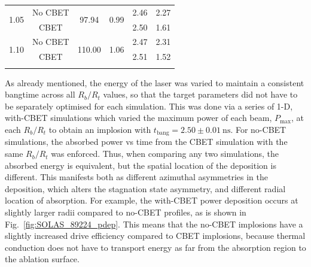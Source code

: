 \begin{table}[]
\begin{tabular}{cccccc}
    \multirow{2}{*}{1.05} & No CBET & \multirow{2}{*}{97.94}                                                             & \multirow{2}{*}{0.99}                                                   & 2.46                                                                      & 2.27                                 \\
                          & CBET    &                                                                                    &                                                                         & 2.50                                                                      & 1.61                                 \\ \hline
    \multirow{2}{*}{1.10} & No CBET & \multirow{2}{*}{110.00}                                                            & \multirow{2}{*}{1.06}                                                   & 2.47                                                                      & 2.31                                 \\
                          & CBET    &                                                                                    &                                                                         & 2.51                                                                      & 1.52                                 \\ \hhline{======}
    \end{tabular}%
    \label{tab:res1_1d_tuning}
\end{table}
\egroup%

As already mentioned, the energy of the laser was varied to maintain a consistent bangtime across all $R_b/R_t$ values, so that the target parameters did not have to be separately optimised for each simulation.
This was done via a series of 1-D, with-\ac{CBET} simulations which varied the maximum power of each beam, $P_{\text{max}}$, at each $R_b/R_t$ to obtain an implosion with $t_{\text{bang}}=2.50 \pm 0.01\ \text{ns}$.
For no-\ac{CBET} simulations, the absorbed power vs time from the \ac{CBET} simulation with the same $R_b/R_t$ was enforced.
Thus, when comparing any two simulations, the absorbed energy is equivalent, but the spatial location of the deposition is different.
This manifests both as different azimuthal asymmetries in the deposition, which alters the stagnation state asymmetry, and different radial location of absorption.
For example, the with-\ac{CBET} power deposition occurs at slightly larger radii compared to no-\ac{CBET} profiles, as is shown in Fig.~\ref{fig:SOLAS_89224_pdep}.
This means that the no-\ac{CBET} implosions have a slightly increased drive efficiency compared to \ac{CBET} implosions, because thermal conduction does not have to transport energy as far from the absorption region to the ablation surface.


